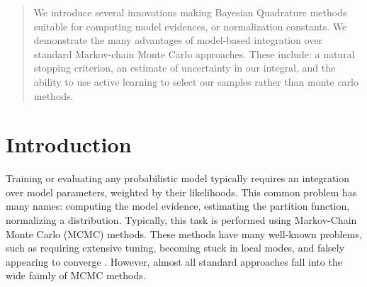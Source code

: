 \documentclass{article}
\begin{document}
 

\begin{abstract} 
We introduce several innovations making Bayesian Quadrature methods suitable for computing model evidences, or normalization constants.  We demonstrate the many advantages of model-based integration over standard Markov-chain Monte Carlo approaches.  These include: a natural stopping criterion, an estimate of uncertainty in our integral, and the ability to use active learning to select our samples rather than monte carlo methods.
\end{abstract} 

\section{Introduction}

Training or evaluating any probabilistic model typically requires an integration over model parameters, weighted by their likelihoods.  This common problem has many names:  computing the model evidence, estimating the partition function, normalizing a distribution.  Typically, this task is performed using Markov-Chain Monte Carlo (MCMC) methods.  These methods have many well-known problems, such as requiring extensive tuning, becoming stuck in local modes, and falsely appearing to converge \citep{NealMC}.  However, almost all standard approaches fall into the wide faimly of MCMC methods.
\end{document}
